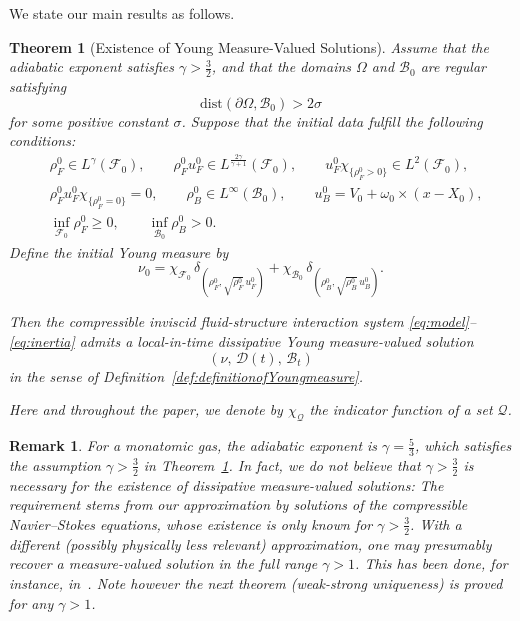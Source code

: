 \documentclass[11pt,twoside,reqno]{amsart}
\numberwithin{equation}{section}
\numberwithin{figure}{section}
\newtheorem{theorem}{Theorem}[section]
\newtheorem{remark}{Remark}[section]
\begin{document}
We state our main results as follows. 

\begin{theorem}[Existence of Young Measure-Valued Solutions]\label{thm:ExistenceofYMVS}
Assume that the adiabatic exponent satisfies $\gamma > \tfrac{3}{2}$, and that the domains $\Omega$ and $\mathcal{B}_0$ are regular satisfying 
\[
\mathrm{dist}(\partial \Omega, \mathcal{B}_0) > 2\sigma
\]
for some positive constant $\sigma$. Suppose that the initial data fulfill the following conditions:
\begin{equation}\label{eq:initial-regularity}
\begin{aligned}
&\rho_F^0\in L^\gamma(\mathcal{F}_0), \qquad 
\rho_F^0 u_F^0\in L^{\frac{2\gamma}{\gamma+1}}(\mathcal{F}_0), \qquad
u_F^0 \chi_{\{\rho_F^0>0\}}\in L^2(\mathcal{F}_0),\\
&\rho_F^0 u_F^0 \chi_{\{\rho_F^0=0\}} = 0, \qquad
\rho_B^0\in L^\infty(\mathcal{B}_0), \qquad
u_B^0 = V_0 + \omega_0\times (x-X_0),\\
&\inf_{\mathcal{F}_0}\rho_F^0 \ge 0, \qquad 
\inf_{\mathcal{B}_0}\rho_B^0 > 0.
\end{aligned}
\end{equation}
Define the initial Young measure by
\[
\nu_0 = \chi_{\mathcal{F}_0}\,\delta_{(\rho_F^0, \sqrt{\rho_F^0}\,u_F^0)}
      + \chi_{\mathcal{B}_0}\,\delta_{(\rho_B^0, \sqrt{\rho_B^0}\,u_B^0)}.
\]

Then the compressible inviscid fluid-structure interaction system \eqref{eq:model}–\eqref{eq:inertia} admits a local-in-time dissipative Young measure-valued solution 
\[
(\nu,\,\mathcal{D}(t),\,\mathcal{B}_t)
\]
in the sense of Definition~\ref{def:definitionofYoungmeasure}.

Here and throughout the paper, we denote by $\chi_{\mathcal{Q}}$ the indicator function of a set $\mathcal{Q}$.
\end{theorem}

\begin{remark}
For a monatomic gas, the adiabatic exponent is $\gamma = \tfrac{5}{3}$, which satisfies the assumption $\gamma > \tfrac{3}{2}$ in Theorem~\ref{thm:ExistenceofYMVS}. In fact, we do not believe that $\gamma>\frac32$ is necessary for the existence of dissipative measure-valued solutions: The requirement stems from our approximation by solutions of the compressible Navier--Stokes equations, whose existence is only known for $\gamma>\frac32$. With a different (possibly physically less relevant) approximation, one may presumably recover a measure-valued solution in the full range $\gamma>1$. This has been done, for instance, in~\cite{MR3567640}. Note however the next theorem (weak-strong uniqueness) is proved for any $\gamma>1$.
\end{remark}
\end{document}
